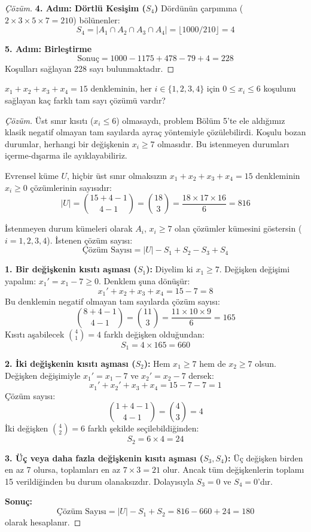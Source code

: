 \begin{proof}[Çözüm]
\textbf{4. Adım: Dörtlü Kesişim ($S_4$)} Dördünün çarpımına
($2 \times 3 \times 5 \times 7 = 210$) bölünenler: \[ S_4 = |A_1 \cap A_2 \cap A_3
\cap A_4| = \lfloor 1000 / 210 \rfloor = 4 \]

\textbf{5. Adım: Birleştirme} \[ \text{Sonuç} = 1000 - 1175 + 478 - 79 + 4 = 228
\] Koşulları sağlayan 228 sayı bulunmaktadır. \end{proof}

\begin{example} $x_1 + x_2 + x_3 + x_4 = 15$ denkleminin, her $i \in \{1, 2, 3, 4\}$
için $0 \le x_i \le 6$ koşulunu sağlayan kaç farklı tam sayı çözümü vardır?
\end{example}

\begin{proof}[Çözüm]
Üst sınır kısıtı ($x_i \le 6$) olmasaydı, problem Bölüm 5'te ele aldığımız
klasik negatif olmayan tam sayılarda ayraç yöntemiyle çözülebilirdi. Koşulu
bozan durumlar, herhangi bir değişkenin $x_i \ge 7$ olmasıdır. Bu istenmeyen
durumları içerme-dışarma ile ayıklayabiliriz.

Evrensel küme $U$, hiçbir üst sınır olmaksızın $x_1 + x_2 + x_3 + x_4 = 15$
denkleminin $x_i \ge 0$ çözümlerinin sayısıdır: \[ |U| = \binom{15 + 4 - 1}{4 - 1}
= \binom{18}{3} = \frac{18 \times 17 \times 16}{6} = 816 \]

İstenmeyen durum kümeleri olarak $A_i$, $x_i \ge 7$ olan çözümler kümesini göstersin
($i = 1, 2, 3, 4$). İstenen çözüm sayısı: \[ \text{Çözüm Sayısı} = |U| - S_1 + S_2
- S_3 + S_4 \]

\textbf{1. Bir değişkenin kısıtı aşması ($S_1$):} Diyelim ki $x_1 \ge 7$.
Değişken değişimi yapalım: $x_1' = x_1 - 7 \ge 0$. Denklem şuna dönüşür: \[ x_1' +
x_2 + x_3 + x_4 = 15 - 7 = 8 \] Bu denklemin negatif olmayan tam sayılarda çözüm
sayısı: \[ \binom{8 + 4 - 1}{4 - 1} = \binom{11}{3} = \frac{11 \times 10
\times 9}{6} = 165 \] Kısıtı aşabilecek $\binom{4}{1} = 4$ farklı değişken
olduğundan: \[ S_1 = 4 \times 165 = 660 \]

\textbf{2. İki değişkenin kısıtı aşması ($S_2$):} Hem $x_1 \ge 7$ hem de $x_2 \ge 7$
olsun. Değişken değişimiyle $x_1' = x_1 - 7$ ve $x_2' = x_2 - 7$ dersek: \[ x_1' +
x_2' + x_3 + x_4 = 15 - 7 - 7 = 1 \] Çözüm sayısı: \[ \binom{1 + 4 - 1}{4 - 1} =
\binom{4}{3} = 4 \] İki değişken $\binom{4}{2} = 6$ farklı şekilde seçilebildiğinden:
\[ S_2 = 6 \times 4 = 24 \]

\textbf{3. Üç veya daha fazla değişkenin kısıtı aşması ($S_3, S_4$):} Üç
değişken birden en az 7 olursa, toplamları en az $7 \times 3 = 21$ olur. Ancak tüm
değişkenlerin toplamı 15 verildiğinden bu durum olanaksızdır. Dolayısıyla
$S_3 = 0$ ve $S_4 = 0$'dır.

\textbf{Sonuç:} \[ \text{Çözüm Sayısı} = |U| - S_1 + S_2 = 816 - 660 + 24 = 180 \]
olarak hesaplanır. \end{proof}

